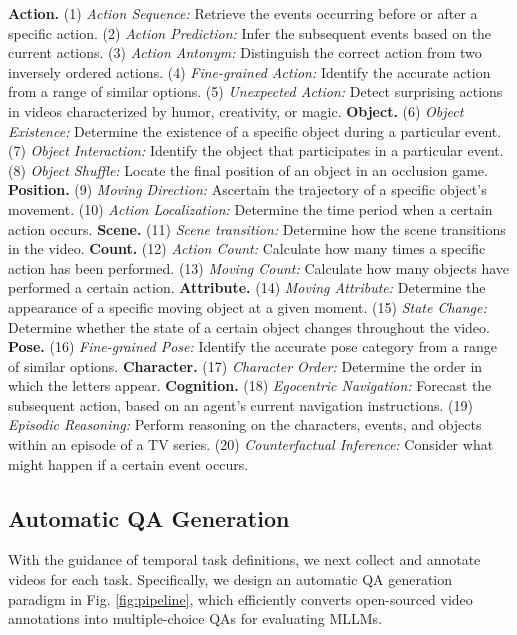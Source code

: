 \textbf{Action.}
(1) \textit{Action Sequence:} Retrieve the events occurring before or after a specific action.
(2) \textit{Action Prediction:} Infer the subsequent events based on the current actions.
(3) \textit{Action Antonym:} Distinguish the correct action from two inversely ordered actions.
(4) \textit{Fine-grained Action:} Identify the accurate action from a range of similar options.
(5) \textit{Unexpected Action:} Detect surprising actions in videos characterized by humor, creativity, or magic.
\textbf{Object.} 
(6) \textit{Object Existence:} Determine the existence of a specific object during a particular event.
(7) \textit{Object Interaction:} Identify the object that participates in a particular event.
(8) \textit{Object Shuffle:} Locate the final position of an object in an occlusion game.
\textbf{Position.}
(9) \textit{Moving Direction:} Ascertain the trajectory of a specific object's movement.
(10) \textit{Action Localization:} Determine the time period when a certain action occurs.
\textbf{Scene.} 
(11) \textit{Scene transition:} Determine how the scene transitions in the video.
\textbf{Count.}
(12) \textit{Action Count:} Calculate how many times a specific action has been performed.
(13) \textit{Moving Count:} Calculate how many objects have performed a certain action.
\textbf{Attribute.}
(14) \textit{Moving Attribute:} Determine the appearance of a specific moving object at a given moment.
(15) \textit{State Change:} Determine whether the state of a certain object changes throughout the video.
\textbf{Pose.} 
(16) \textit{Fine-grained Pose:} Identify the accurate pose category from a range of similar options.
\textbf{Character.}
(17) \textit{Character Order:} Determine the order in which the letters appear.
\textbf{Cognition.}
(18) \textit{Egocentric Navigation:} Forecast the subsequent action, based on an agent's current navigation instructions.
(19) \textit{Episodic Reasoning:} Perform reasoning on the characters, events, and objects within an episode of a TV series.
(20) \textit{Counterfactual Inference:} Consider what might happen if a certain event occurs.

\subsection{Automatic QA Generation}
\label{sec:generation}

With the guidance of temporal task definitions,
we next collect and annotate videos for each task.
Specifically,
we design an automatic QA generation paradigm in Fig. \ref{fig:pipeline},
which efficiently converts open-sourced video annotations into multiple-choice QAs for evaluating MLLMs.

